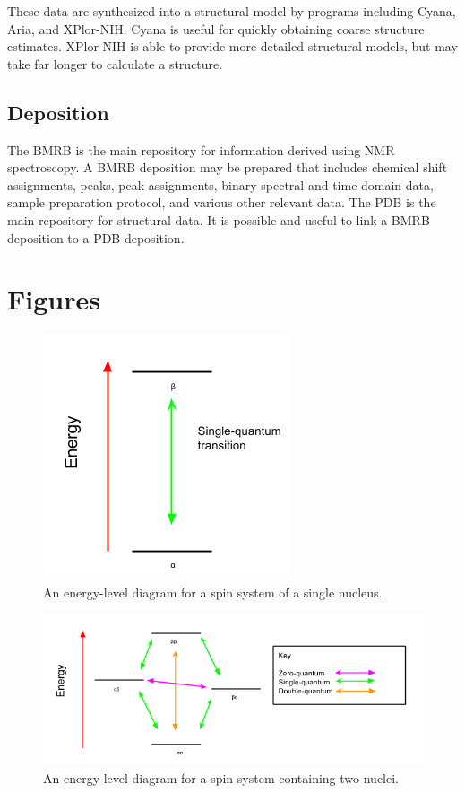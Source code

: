 These data are synthesized into a structural model by programs including Cyana,
Aria, and XPlor-NIH.  Cyana is useful for quickly obtaining coarse structure
estimates.  XPlor-NIH is able to provide more detailed structural models, but
may take far longer to calculate a structure.

\subsection*{Deposition}

The BMRB is the main repository for information derived using NMR spectroscopy.
A BMRB deposition may be prepared that includes chemical shift assignments,
peaks, peak assignments, binary spectral and time-domain data, sample 
preparation protocol, and various other relevant data.  The PDB is the main 
repository for structural data.  It is possible and useful to link a BMRB
deposition to a PDB deposition.




\clearpage
\section{Figures}

\begin{figure}[h]
  \includegraphics[scale=0.5]{figures/one_spin_1-2}
  \caption{An energy-level diagram for a spin system of a single nucleus.}
  \label{one_spin_1-2}
\end{figure}

\begin{figure}[h]
  \includegraphics[scale=0.5]{figures/two_spins_1-2}
  \caption{An energy-level diagram for a spin system containing two nuclei.}
  \label{two_spins_1-2}
\end{figure}

